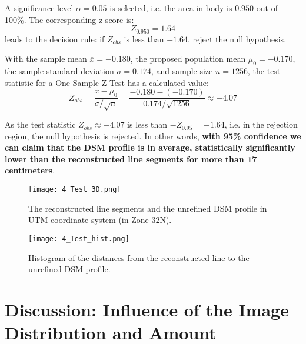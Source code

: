 A significance level $\alpha=0.05$ is selected, i.e. the area in body is $0.950$ out of 100\%. The corresponding z-score is:
\begin{equation*}
Z_{0.950}=1.64
\end{equation*}
leads to the decision rule: if $Z_{obs}$ is less than $-1.64$, reject the null hypothesis.

With the sample mean $\overline{x}=-0.180$,
the proposed population mean $\mu_0=-0.170$,
the sample standard deviation $\sigma=0.174$,
and sample size $n=1256$, the test statistic for a One Sample Z Test has a calculated value:
\begin{equation*}
Z_{obs} = \frac{\overline{x}-\mu_0}{\sigma/\sqrt{n}}=\frac{-0.180-(-0.170)}{0.174/\sqrt{1256}}\approx-4.07
\end{equation*}

As the test statistic $Z_{obs}\approx-4.07$ is less than $-Z_{0.95}=-1.64$, i.e. in the rejection region, the null hypothesis is rejected. In other words, \textbf{with 95\% confidence we can claim that the DSM profile is in average, statistically significantly lower than the reconstructed line segments for more than $\mathbf{17}$ centimeters}. %

\begin{figure}
  \centering
  \texttt{[image: 4\_Test\_3D.png]} %
  \caption{\small The reconstructed line segments and the unrefined DSM profile in UTM coordinate system (in Zone 32N).}
  \label{fig:Test3D_1}
  \vspace{1cm}
  \texttt{[image: 4\_Test\_hist.png]} %
  \caption{\small Histogram of the distances from the reconstructed line to the unrefined DSM profile.}
  \label{fig:TestHist_1}
\end{figure}










\section{Discussion: Influence of the Image Distribution and Amount}
\label{sec:discussion-ImageDistributionAmount}




